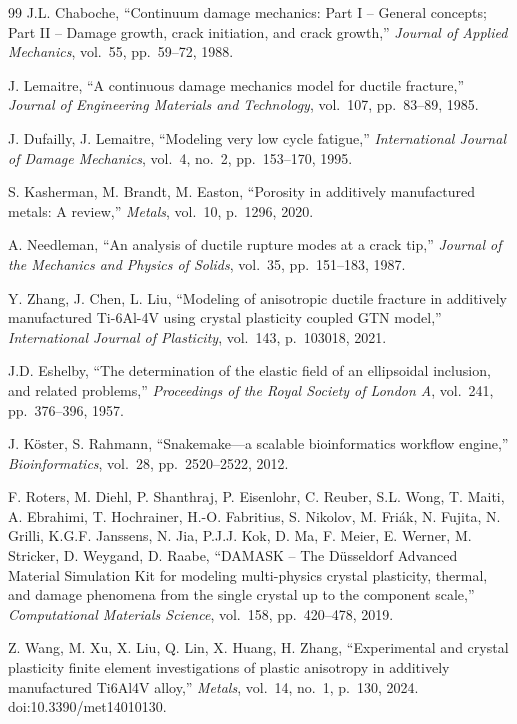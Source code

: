 \begin{thebibliography}{99}
J.L. Chaboche, ``Continuum damage mechanics: Part I -- General concepts; Part II -- Damage growth, crack initiation, and crack growth,'' \textit{Journal of Applied Mechanics}, vol.~55, pp.~59--72, 1988.

J. Lemaitre, ``A continuous damage mechanics model for ductile fracture,'' \textit{Journal of Engineering Materials and Technology}, vol.~107, pp.~83--89, 1985.

J. Dufailly, J. Lemaitre, ``Modeling very low cycle fatigue,'' \textit{International Journal of Damage Mechanics}, vol.~4, no.~2, pp.~153--170, 1995.

S. Kasherman, M. Brandt, M. Easton, ``Porosity in additively manufactured metals: A review,'' \textit{Metals}, vol.~10, p.~1296, 2020.

A. Needleman, ``An analysis of ductile rupture modes at a crack tip,'' \textit{Journal of the Mechanics and Physics of Solids}, vol.~35, pp.~151--183, 1987.

Y. Zhang, J. Chen, L. Liu, ``Modeling of anisotropic ductile fracture in additively manufactured Ti-6Al-4V using crystal plasticity coupled GTN model,'' \textit{International Journal of Plasticity}, vol.~143, p.~103018, 2021.

J.D. Eshelby, ``The determination of the elastic field of an ellipsoidal inclusion, and related problems,'' \textit{Proceedings of the Royal Society of London A}, vol.~241, pp.~376--396, 1957.

J. K\"{o}ster, S. Rahmann, ``Snakemake---a scalable bioinformatics workflow engine,'' \textit{Bioinformatics}, vol.~28, pp.~2520--2522, 2012.

F. Roters, M. Diehl, P. Shanthraj, P. Eisenlohr, C. Reuber, S.L. Wong, T. Maiti, A. Ebrahimi, T. Hochrainer, H.-O. Fabritius, S. Nikolov, M. Fri\'{a}k, N. Fujita, N. Grilli, K.G.F. Janssens, N. Jia, P.J.J. Kok, D. Ma, F. Meier, E. Werner, M. Stricker, D. Weygand, D. Raabe, ``DAMASK -- The D\"{u}sseldorf Advanced Material Simulation Kit for modeling multi-physics crystal plasticity, thermal, and damage phenomena from the single crystal up to the component scale,'' \textit{Computational Materials Science}, vol.~158, pp.~420--478, 2019.

Z. Wang, M. Xu, X. Liu, Q. Lin, X. Huang, H. Zhang, ``Experimental and crystal plasticity finite element investigations of plastic anisotropy in additively manufactured Ti6Al4V alloy,'' \textit{Metals}, vol.~14, no.~1, p.~130, 2024. doi:10.3390/met14010130.


\end{thebibliography}
